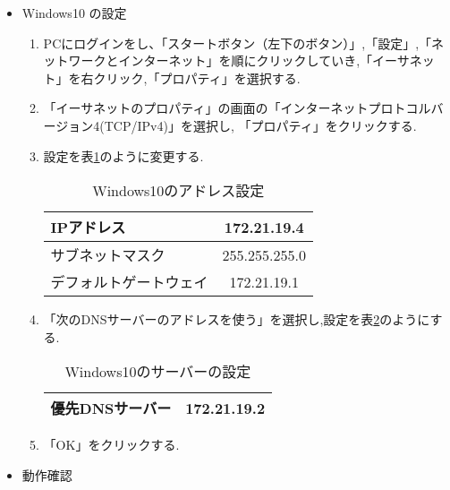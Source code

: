 \documentclass[a4j,titlepage]{jarticle}
\begin{document}
\begin{itemize}
  
\item Windows10 の設定\\
\begin{enumerate}
\item PCにログインをし、「スタートボタン（左下のボタン）」,「設定」,「ネットワークとインターネット」を順にクリックしていき,「イーサネット」を右クリック,「プロパティ」を選択する.\\
\item 「イーサネットのプロパティ」の画面の「インターネットプロトコルバージョン4(TCP/IPv4)」を選択し, 「プロパティ」をクリックする.

\item  設定を表\ref{tab:win10rou}のように変更する.
  \begin{table}[h]
\caption{Windows10のアドレス設定}
\label{tab:win10rou}
\begin{center}
\begin{tabular}{|l||c|}
\hline
IPアドレス & 172.21.19.4\\ \hline
サブネットマスク & 255.255.255.0\\ \hline
デフォルトゲートウェイ & 172.21.19.1\\ \hline
\end{tabular}
\end{center}
\end{table}
\item 「次のDNSサーバーのアドレスを使う」を選択し,設定を表\ref{tab:sbwin10}のようにする.

  
\begin{table}[h]
\caption{Windows10のサーバーの設定}
\label{tab:sbwin10}
\begin{center}
\begin{tabular}{|l||c|}
\hline
優先DNSサーバー & 172.21.19.2\\ \hline
\end{tabular}
\end{center}
\end{table}
\item 「OK」をクリックする.\\
\end{enumerate}

\item 動作確認

\begin{enumerate}


\end{enumerate}
\end{itemize}
\end{document}
